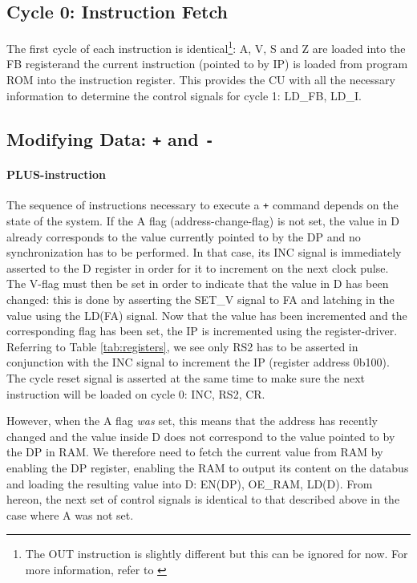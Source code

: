 \subsection{Cycle 0: Instruction Fetch}
The first cycle of each instruction is identical\footnote{The OUT instruction is slightly different but this can be ignored for now. For more information, refer to \label{sec:??}}: A, V, S and Z are loaded into the FB registerand the current instruction (pointed to by IP) is loaded from program ROM into the instruction register. This provides the CU with all the necessary information to determine the control signals for cycle 1: LD\_FB, LD\_I.

\subsection{Modifying Data: \texttt{+} and \texttt{-}} \label{sec:sequences:+-}
\paragraph{PLUS-instruction} The sequence of instructions necessary to execute a \texttt{+} command depends on the state of the system. If the A flag (address-change-flag) is not set, the value in D already corresponds to the value currently pointed to by the DP and no synchronization has to be performed. In that case, its INC signal is immediately asserted to the D register in order for it to increment on the next clock pulse. The V-flag must then be set in order to indicate that the value in D has been changed: this is done by asserting the SET\_V signal to FA and latching in the value using the LD(FA) signal. Now that the value has been incremented and the corresponding flag has been set, the IP is incremented using the register-driver. Referring to Table \ref{tab:registers}, we see only RS2 has to be asserted in conjunction with the INC signal to increment the IP (register address 0b100). The cycle reset signal is asserted at the same time to make sure the next instruction will be loaded on cycle 0: INC, RS2, CR.

However, when the A flag \emph{was} set, this means that the address has recently changed and the value inside D does not correspond to the value pointed to by the DP in RAM. We therefore need to fetch the current value from RAM by enabling the DP register, enabling the RAM to output its content on the databus and loading the resulting value into D: EN(DP), OE\_RAM, LD(D). From hereon, the next set of control signals is identical to that described above in the case where A was not set.

